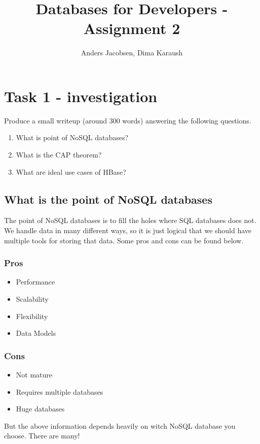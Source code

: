 \documentclass{article}
\title{Databases for Developers - Assignment 2}
\author{Anders Jacobsen, Dima Karaush}
\begin{document}
\maketitle

\section{Task 1 - investigation}
Produce a small writeup (around 300 words) answering the following questions.
\begin{enumerate}
\item What is point of NoSQL databases?
\item What is the CAP theorem?
\item What are ideal use cases of HBase?
\end{enumerate}

\subsection{What is the point of NoSQL databases}
The point of NoSQL databases is to fill the holes where SQL databases does not. 
We handle data in many different ways, so it is just logical that we should have 
multiple tools for storing that data. Some pros and cons can be found below. 
\subsubsection*{Pros}
\begin{itemize}
    \item Performance
    \item Scalability
    \item Flexibility
    \item Data Models
\end{itemize}

\subsubsection*{Cons}
\begin{itemize}
    \item Not mature
    \item Requires multiple databases
    \item Huge databases
\end{itemize}

But the above information depends heavily on witch NoSQL database you choose. There are many!
\end{document}
